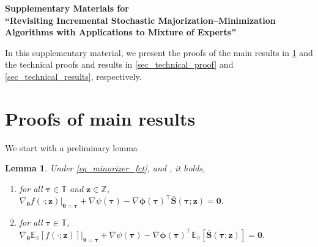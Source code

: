 \documentclass{article}
\newcommand{\zero}{\ensuremath{\mathbf{0}}}
\def\phib        {{\sbmm{\phi}}\XS}        \def\Phib       {{\sbmm{\Phi}}\XS}
\def\XS{\xspace}
\def\sbmm#1{\ensuremath{\boldsymbol{#1}}}
\newtheorem{lemma}{Lemma}
\def\PE{\mathbb{E}_\pi} %
\def\bars{\bar{\vS}}
\def\rvz{{\mathbf{z}}}
\def\vtau{{\bm{\tau}}}
\def\vtheta{{\bm{\theta}}}
\def\vS{{\bm{S}}}
\def\sT{{\mathbb{T}}}
\def\sZ{{\mathbb{Z}}}
\begin{document}

\appendix

\begin{center}
\textbf{{\Large Supplementary Materials for\\``Revisiting Incremental Stochastic Majorization–Minimization Algorithms with Applications to Mixture of Experts''}}
\end{center}

In this supplementary material, we present the proofs of the main results in \cref{sec_proofs_main_results} and the technical proofs and results in \cref{sec_technical_proof} and \cref{sec_technical_results}, respectively.



\section{Proofs of main results}\label{sec_proofs_main_results}
We start with a preliminary lemma
\begin{lemma}\label{lem: gradientofF}
Under \cref{eq_minorizer_fct},  and ,
    it holds, 
    \begin{enumerate}
    \item for all $\vtau \in \sT$ and $ \rvz \in \sZ$,  $
\nabla_\vtheta f(\cdot;\rvz) \vert_{\vtheta=\vtau}
  + \nabla \psi(\vtau)
  - \nabla \phib(\vtau)^\top \bars(\vtau;\rvz)  = \zero .
$
        \item for all $\vtau \in \sT$, $
\nabla_\vtheta \PE\left[f(\cdot;\rvz)\right] \vert_{\vtheta=\vtau}
  + \nabla \psi(\vtau)
  - \nabla \phib(\vtau)^\top \PE\left[\bars(\vtau;\rvz) \right] = \zero .
$
    \end{enumerate}
\end{lemma}
\end{document}
